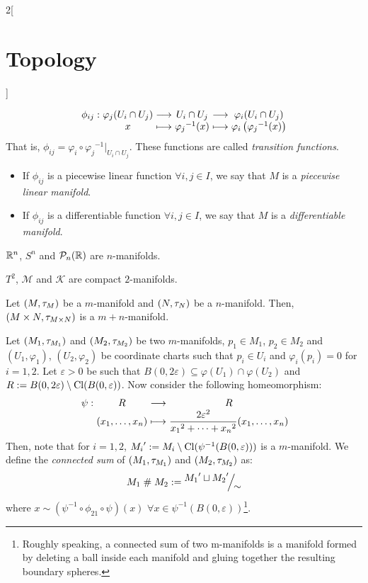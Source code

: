 \documentclass[../../../main.tex]{subfiles}
\begin{document}
\begin{multicols}{2}[\section{Topology}]
\begin{definition}
$$      \begin{array}{r@{\hspace{0.5\tabcolsep}}c@{\hspace{0.5\tabcolsep}}c@{\hspace{0.5\tabcolsep}}c@{\hspace{0.5\tabcolsep}}c@{\hspace{0.5\tabcolsep}}c}
        \phi_{ij}: & \varphi_j(U_i\cap U_j) & \longrightarrow & U_i\cap U_j         & \longrightarrow & \varphi_i(U_i\cap U_j)                    \\
                   & x                      & \longmapsto     & {\varphi_j}^{-1}(x) & \longmapsto     & \varphi_i\left({\varphi_j}^{-1}(x)\right)
      \end{array}$$
    That is, $\phi_{ij}=\varphi_i\circ{\varphi_j}^{-1}|_{U_i\cap U_j}$. These functions are called \emph{transition functions}.
    \begin{itemize}
      \item If $\phi_{ij}$ is a piecewise linear function $\forall i,j\in I$, we say that $M$ is a \emph{piecewise linear manifold}.
      \item If $\phi_{ij}$ is a differentiable function $\forall i,j\in I$, we say that $M$ is a \emph{differentiable manifold}.
    \end{itemize}
  \end{definition}
  \begin{prop}
    $\mathbb{R}^n$, $S^n$ and $\mathcal{P}_n(\mathbb{R})$ are $n$-manifolds.
  \end{prop}
  \begin{prop}
    $T^2$, $\mathcal{M}$ and $\mathcal{K}$ are compact $2$-manifolds.
  \end{prop}
  \begin{prop}
    Let $(M,\tau_M)$ be a $m$-manifold and $(N,\tau_N)$ be a $n$-manifold. Then, $(M\times N,\tau_{M\times N})$ is a $m+n$-manifold.
  \end{prop}
  \begin{definition}
    Let $(M_1,\tau_{M_1})$ and $(M_2,\tau_{M_2})$ be two $m$-manifolds, $p_1\in M_1$, $p_2\in M_2$ and $(U_1,\varphi_1)$, $(U_2,\varphi_2)$ be coordinate charts such that $p_i\in U_i$ and $\varphi_i(p_i)=0$ for $i=1,2$. Let $\varepsilon>0$ be such that $B(0,2\varepsilon)\subseteq \varphi(U_1)\cap \varphi(U_2)$ and $R:=B(0,2\varepsilon)\setminus\operatorname{Cl} (B(0,\varepsilon))$. Now consider the following homeomorphism:
    $$\function{\psi}{R}{R}{(x_1,\ldots,x_n)}{\displaystyle\frac{2\varepsilon^2}{{x_1}^2+\cdots+{x_n}^2}(x_1,\ldots,x_n)}$$
    Then, note that for $i=1,2$, ${M_i}':=M_i\setminus\operatorname{Cl}(\psi^{-1}(B(0,\varepsilon)))$ is a $m$-manifold. We define the \emph{connected sum} of $(M_1,\tau_{M_1})$ and $(M_2,\tau_{M_2})$ as: $$M_1\conn M_2:=\quot{{M_1}'\sqcup{M_2}'}{\sim}$$
    where $x\sim (\psi^{-1}\circ\phi_{21}\circ\psi)(x)$ $\forall x\in \psi^{-1}(B(0,\varepsilon))$\footnote{Roughly speaking, a connected sum of two m-manifolds is a manifold formed by deleting a ball inside each manifold and gluing together the resulting boundary spheres.}.
  \end{definition}

\end{multicols}
\end{document}
